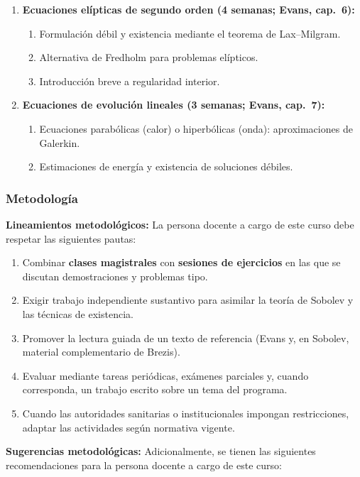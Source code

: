 \begin{refsection}
\begin{enumerate}
\item \textbf{Ecuaciones elípticas de segundo orden (4 semanas; Evans, cap.~6):}
\begin{enumerate}
    \item Formulación débil y existencia mediante el teorema de Lax--Milgram.
    \item Alternativa de Fredholm para problemas elípticos.
    \item Introducción breve a regularidad interior.
\end{enumerate}

\item \textbf{Ecuaciones de evolución lineales (3 semanas; Evans, cap.~7):}
\begin{enumerate}
    \item Ecuaciones parabólicas (calor) o hiperbólicas (onda): aproximaciones de Galerkin.
    \item Estimaciones de energía y existencia de soluciones débiles.
\end{enumerate}

\end{enumerate}

\subsubsection*{Metodología}

\noindent \textbf{Lineamientos metodológicos:} La persona docente a cargo de este curso debe respetar las siguientes pautas:

\begin{enumerate}
    \item Combinar \textbf{clases magistrales} con \textbf{sesiones de ejercicios} en las que se discutan demostraciones y problemas tipo.
    \item Exigir trabajo independiente sustantivo para asimilar la teoría de Sobolev y las técnicas de existencia.
    \item Promover la lectura guiada de un texto de referencia (Evans y, en Sobolev, material complementario de Brezis).
    \item Evaluar mediante tareas periódicas, exámenes parciales y, cuando corresponda, un trabajo escrito sobre un tema del programa.
    \item Cuando las autoridades sanitarias o institucionales impongan restricciones, adaptar las actividades según normativa vigente.
\end{enumerate}

\textbf{Sugerencias metodológicas:} Adicionalmente, se tienen las siguientes recomendaciones para la persona docente a cargo de este curso:


\end{refsection}
